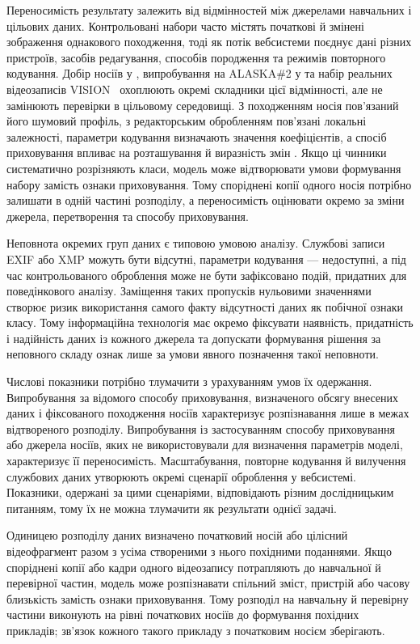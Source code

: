 Переносимість результату залежить від відмінностей між джерелами навчальних і цільових даних. Контрольовані набори часто містять початкові й змінені зображення однакового походження, тоді як потік вебсистеми поєднує дані різних пристроїв, засобів редагування, способів породження та режимів повторного кодування. Добір носіїв у \cite{ma2023coverselection}, випробування на ALASKA\#2 у \cite{xie2023selfattention} та набір реальних відеозаписів VISION~\cite{shullani2017vision} охоплюють окремі складники цієї відмінності, але не замінюють перевірки в цільовому середовищі. З походженням носія пов’язаний його шумовий профіль, з редакторським обробленням пов’язані локальні залежності, параметри кодування визначають значення коефіцієнтів, а спосіб приховування впливає на розташування й виразність змін \cite{azame2025coverselection,ma2023coverselection}. Якщо ці чинники систематично розрізняють класи, модель може відтворювати умови формування набору замість ознаки приховування. Тому споріднені копії одного носія потрібно залишати в одній частині розподілу, а переносимість оцінювати окремо за зміни джерела, перетворення та способу приховування.

Неповнота окремих груп даних є типовою умовою аналізу. Службові записи EXIF або XMP можуть бути відсутні, параметри кодування --- недоступні, а під час контрольованого оброблення може не бути зафіксовано подій, придатних для поведінкового аналізу. Заміщення таких пропусків нульовими значеннями створює ризик використання самого факту відсутності даних як побічної ознаки класу. Тому інформаційна технологія має окремо фіксувати наявність, придатність і надійність даних із кожного джерела та допускати формування рішення за неповного складу ознак лише за умови явного позначення такої неповноти.

Числові показники потрібно тлумачити з урахуванням умов їх одержання. Випробування за відомого способу приховування, визначеного обсягу внесених даних і фіксованого походження носіїв характеризує розпізнавання лише в межах відтвореного розподілу. Випробування із застосуванням способу приховування або джерела носіїв, яких не використовували для визначення параметрів моделі, характеризує її переносимість. Масштабування, повторне кодування й вилучення службових даних утворюють окремі сценарії оброблення у вебсистемі. Показники, одержані за цими сценаріями, відповідають різним дослідницьким питанням, тому їх не можна тлумачити як результати однієї задачі.

Одиницею розподілу даних визначено початковий носій або цілісний відеофрагмент разом з усіма створеними з нього похідними поданнями. Якщо споріднені копії або кадри одного відеозапису потрапляють до навчальної й перевірної частин, модель може розпізнавати спільний зміст, пристрій або часову близькість замість ознаки приховування. Тому розподіл на навчальну й перевірну частини виконують на рівні початкових носіїв до формування похідних прикладів; зв’язок кожного такого прикладу з початковим носієм зберігають.

